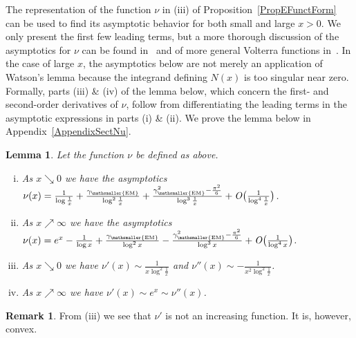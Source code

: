 \documentclass[10pt]{article}
\numberwithin{equation}{section}
\newtheorem{lemma}[theorem]{Lemma}
\theoremstyle{definition}
\newtheorem{remark}[theorem]{Remark}
\begin{document}
The representation of the function $\nu$  in (iii) of Proposition~\ref{PropEFunctForm} can  be used to find its asymptotic behavior for  both small and large $x>0$. We only present the first few leading terms,  but a more thorough discussion of the asymptotics for $\nu$ can be found in~\cite{Llewellyn} and of more general Volterra functions in~\cite{Garrappa}.  In the case of large $x$, the asymptotics below are not merely an application of Watson's lemma because the integrand defining $N(x)$  is too singular near zero. Formally, parts (iii) \& (iv) of the lemma below, which concern the first- and second-order derivatives of $\nu$, follow from differentiating the leading terms in the asymptotic expressions in parts (i) \& (ii). We prove the lemma below in Appendix~\ref{AppendixSectNu}.  
\begin{lemma}\label{LemmaEFunAsy} Let the function $\nu$ be defined as above. \vspace{-.2cm}

\begin{enumerate}[(i)]

\item As $x\searrow 0$ we have the asymptotics $  \nu(x)= \frac{1}{\log \frac{1}{x}  }+ \frac{\gamma_{\mathsmaller{\textup{EM}}}}{\log^2 \frac{1}{x}  }+\frac{\gamma_{\mathsmaller{\textup{EM}}}^2-\frac{ \pi^2 }{6} }{\log^3 \frac{1}{x}  }+ \mathit{O}\big(\frac{1}{\log^4 \frac{1}{x}  } \big) $. 

\item  As $x\nearrow \infty$ we have the asymptotics
$  \nu(x)= e^{x}-\frac{1}{\log x  }+ \frac{\gamma_{\mathsmaller{\textup{EM}}}}{\log^2 x   }-\frac{\gamma_{\mathsmaller{\textup{EM}}}^2-\frac{ \pi^2 }{6} }{\log^3 x  }+ \mathit{O}\big(\frac{1}{\log^4 x } \big)  $.


\item As $x\searrow 0$ we have $ \nu'(x)\sim \frac{1}{x\log^2\frac{1}{x}  } $ and $ \nu''(x)\sim  -\frac{1}{x^2\log^2\frac{1}{x}  } $.

\item  As  $x\nearrow \infty$ we have  $ \nu'(x)\sim e^x\sim \nu''(x)$.


\end{enumerate}
\end{lemma}

\begin{remark}\label{Remark1st}
From (iii) we see that $\nu'$ is not an increasing function. It is, however,  convex.   
\end{remark}
\end{document}

